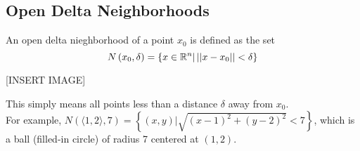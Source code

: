 \subsection{Open Delta Neighborhoods}
\noindent
An open delta nieghborhood of a point $x_0$ is defined as the set $$N\left(x_0, \delta\right)=\left\{x\in\mathbb{R}^n|\left|\left|x-x_0\right|\right|<\delta\right\}$$

[INSERT IMAGE]

\noindent
This simply means all points less than a distance $\delta$ away from $x_0$.\\
For example, $N(\langle 1,2\rangle , 7)=\left\{(x,y)|\sqrt{(x-1)^2+(y-2)^2}<7\right\}$, which is a ball (filled-in circle) of radius 7 centered at $(1,2)$.
